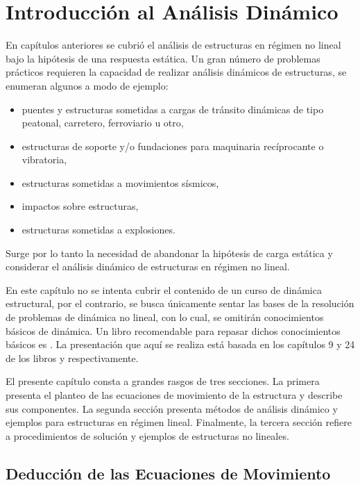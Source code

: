 \chapter{Introducción al Análisis Dinámico}\label{cap4DIN}

En capítulos anteriores se cubrió el análisis de estructuras en régimen no lineal bajo la hipótesis de una respuesta estática. Un gran número de problemas prácticos requieren la capacidad de realizar análisis dinámicos de estructuras, se enumeran algunos a modo de ejemplo:
%
\begin{itemize}
	\item puentes y estructuras sometidas a cargas de tránsito dinámicas de tipo peatonal, carretero, ferroviario u otro,
	\item estructuras de soporte y/o fundaciones para maquinaria recíprocante o vibratoria,
	\item estructuras sometidas a movimientos sísmicos,
	\item impactos sobre estructuras,
	\item estructuras sometidas a explosiones.
\end{itemize}
%
Surge por lo tanto la necesidad de abandonar la hipótesis de carga estática y considerar el análisis dinámico de estructuras en régimen no lineal.

En este capítulo no se intenta cubrir el contenido de un curso de dinámica estructural, por el contrario, se busca únicamente sentar las bases de la resolución de problemas de dinámica no lineal, con lo cual, se omitirán conocimientos básicos de dinámica. %
%
Un libro recomendable para repasar dichos conocimientos básicos es \citep{clough1993dynamics}. %
%
La presentación que aquí se realiza está basada en los capítulos 9 y 24 de los libros \citep{Bathe2014} y \citep{Crisfield1997} respectivamente.

El presente capítulo consta a grandes rasgos de tres secciones. La primera presenta el planteo de las ecuaciones de movimiento de la estructura y describe sus componentes. La segunda sección presenta métodos de análisis dinámico y ejemplos para estructuras en régimen lineal. Finalmente, la tercera sección refiere a procedimientos de solución y ejemplos de estructuras no lineales.



\section{Deducción de las Ecuaciones de Movimiento}\label{EcMov}

